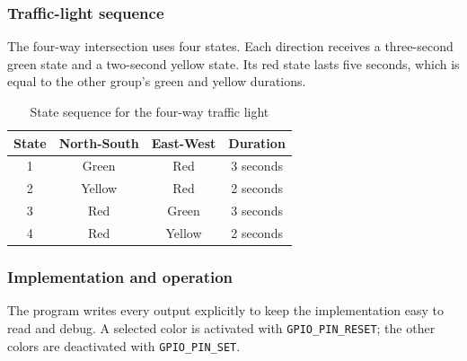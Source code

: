 \documentclass[a4paper]{article}
\begin{document}
\subsubsection{Traffic-light sequence}

The four-way intersection uses four states. Each direction receives a
three-second green state and a two-second yellow state. Its red state lasts
five seconds, which is equal to the other group's green and yellow durations.

\begin{table}[H]
    \centering
    \caption{State sequence for the four-way traffic light}
    \label{tab:exercise3-sequence}
    \begin{tabular}{cccc}
        \toprule
        \textbf{State} & \textbf{North-South} & \textbf{East-West} & \textbf{Duration} \\
        \midrule
        1 & Green & Red & 3 seconds \\
        2 & Yellow & Red & 2 seconds \\
        3 & Red & Green & 3 seconds \\
        4 & Red & Yellow & 2 seconds \\
        \bottomrule
    \end{tabular}
\end{table}

\subsubsection{Implementation and operation}

The program writes every output explicitly to keep the implementation easy to
read and debug. A selected color is activated with
\texttt{GPIO\_PIN\_RESET}; the other colors are deactivated with
\texttt{GPIO\_PIN\_SET}.
\end{document}
